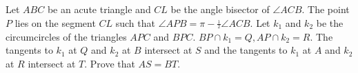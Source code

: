 Let $ ABC$ be an acute triangle and $ CL$ be the angle bisector of $ \angle ACB$. The point $ P$ lies on  the segment $CL$ such that $ \angle APB=\pi-\frac{_1}{^2}\angle ACB$. Let $ k_1$ and $ k_2$ be the circumcircles of the triangles $ APC$ and $ BPC$. $ BP\cap k_1=Q, AP\cap k_2=R$. The tangents to $ k_1$ at $ Q$ and $ k_2$ at $ B$ intersect at $ S$ and the tangents to $ k_1$ at $ A$ and $ k_2$ at $ R$ intersect at $ T$. Prove that $ AS=BT.$